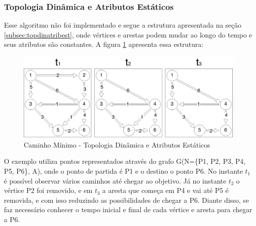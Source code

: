 % 
% 



\subsubsection{Topologia Dinâmica e Atributos Estáticos}
Esse algoritmo não foi implementado e segue a estrutura apresentada na seção \ref{subsec:topdinatribest},
onde vértices e arestas podem mudar ao longo do tempo e seus atributos são constantes. A 
figura \ref{fig:pathtopdyn} apresenta essa estrutura:

\begin{figure}[htbp]
\centering
 \includegraphics[width=.80\textwidth]{chapters/fig/pathtopdyn.png}
\caption{Caminho Mínimo - Topologia Dinâmica e Atributos Estáticos}
\label{fig:pathtopdyn}
\end{figure}
\FloatBarrier
O exemplo utiliza pontos representados através do grafo G(N=\{P1, P2, P3, P4, P5, P6\}, A), onde o 
ponto de partida é P1 e o destino o ponto P6. No instante $t_1$ é possível observar vários caminhos
até chegar ao objetivo. Já no instante $t_2$ o vértice P2 foi removido, e em $t_3$ a aresta que começa em
P4 e vai até P5 é removida, e com isso reduzindo as possibilidades de chegar a P6. Diante disso,
se faz necessário conhecer o tempo inicial e final de cada vértice e aresta para chegar a P6.

